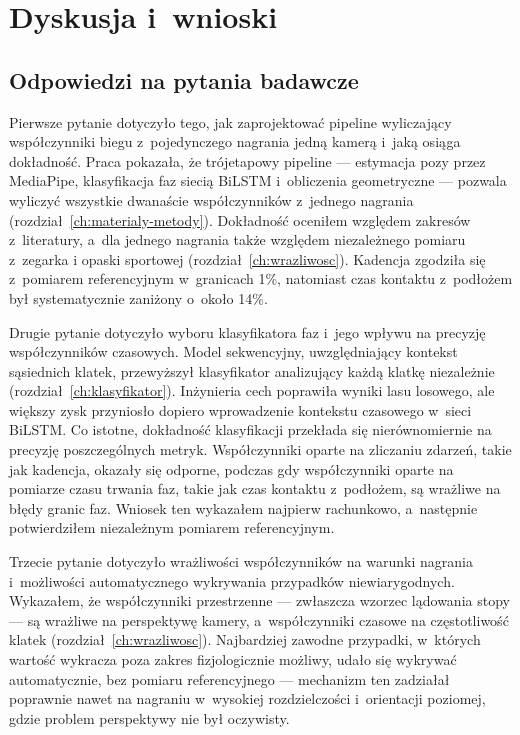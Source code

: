 \chapter{Dyskusja i~wnioski}
\label{ch:dyskusja-wnioski}

\section{Odpowiedzi na pytania badawcze}
\label{sec:odpowiedz-pytania}

Pierwsze pytanie dotyczyło tego, jak zaprojektować pipeline wyliczający współczynniki biegu z~pojedynczego nagrania jedną kamerą i~jaką osiąga dokładność. Praca pokazała, że trójetapowy pipeline --- estymacja pozy przez MediaPipe, klasyfikacja faz siecią BiLSTM i~obliczenia geometryczne --- pozwala wyliczyć wszystkie dwanaście współczynników z~jednego nagrania (rozdział~\ref{ch:materialy-metody}). Dokładność oceniłem względem zakresów z~literatury, a~dla jednego nagrania także względem niezależnego pomiaru z~zegarka i opaski sportowej (rozdział~\ref{ch:wrazliwosc}). Kadencja zgodziła się z~pomiarem referencyjnym w~granicach 1\%, natomiast czas kontaktu z~podłożem był systematycznie zaniżony o~około 14\%. 

Drugie pytanie dotyczyło wyboru klasyfikatora faz i~jego wpływu na precyzję współczynników czasowych. Model sekwencyjny, uwzględniający kontekst sąsiednich klatek, przewyższył klasyfikator analizujący każdą klatkę niezależnie (rozdział~\ref{ch:klasyfikator}). Inżynieria cech poprawiła wyniki lasu losowego, ale większy zysk przyniosło dopiero wprowadzenie kontekstu czasowego w~sieci BiLSTM. Co istotne, dokładność klasyfikacji przekłada się nierównomiernie na precyzję poszczególnych metryk. Współczynniki oparte na zliczaniu zdarzeń, takie jak kadencja, okazały się odporne, podczas gdy współczynniki oparte na pomiarze czasu trwania faz, takie jak czas kontaktu z~podłożem, są wrażliwe na błędy granic faz. Wniosek ten wykazałem najpierw rachunkowo, a~następnie potwierdziłem niezależnym pomiarem referencyjnym.

Trzecie pytanie dotyczyło wrażliwości współczynników na warunki nagrania i~możliwości automatycznego wykrywania przypadków niewiarygodnych. Wykazałem, że współczynniki przestrzenne --- zwłaszcza wzorzec lądowania stopy --- są wrażliwe na perspektywę kamery, a~współczynniki czasowe na częstotliwość klatek (rozdział~\ref{ch:wrazliwosc}). Najbardziej zawodne przypadki, w~których wartość wykracza poza zakres fizjologicznie możliwy, udało się wykrywać automatycznie, bez pomiaru referencyjnego --- mechanizm ten zadziałał poprawnie nawet na nagraniu w~wysokiej rozdzielczości i~orientacji poziomej, gdzie problem perspektywy nie był oczywisty.

